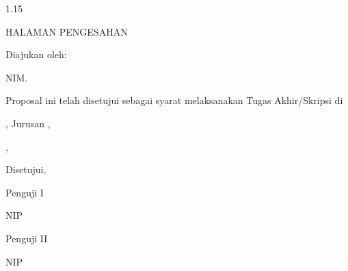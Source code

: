 \makeisititle{\thesistitle}{\researchername}{\researchernim}{\academicyear}{\graduationyear}
\setcounter{page}{2}

\newpage
\begin{spacing}{1.15}
\begin{center}
    HALAMAN PENGESAHAN\par
    \vspace{0.8cm}
    \textbf{\thesistitle}\par
    \vspace{0.6cm}
    Diajukan oleh:\par
    \researchername\par
    NIM. \researchernim\par
    \vspace{0.8cm}
    Proposal ini telah disetujui sebagai syarat melaksanakan Tugas Akhir/Skripsi di\par
    \programstudy, Jurusan \departmentname{} \facultyname,\par
    \institutionname\par
    \vspace{1.0cm}
    
    \cityname, \submissiondate\par
    Disetujui,\par
    \vspace{0.4cm}
    
    \begin{minipage}[t]{0.48\textwidth}
        \raggedright
        Penguji I\par
        \vspace{2.0cm}
        \underline{\textbf{\examinerone}}\par
        NIP \examineronenip
    \end{minipage}
    \hfill
    \begin{minipage}[t]{0.48\textwidth}
        \raggedleft
        Penguji II\par
        \vspace{2.0cm}
        \underline{\textbf{\examinertwo}}\par
        NIP \examinertwonip
    \end{minipage}\par
    
    \vspace{1.2cm}
    

\end{center}
\end{spacing}

